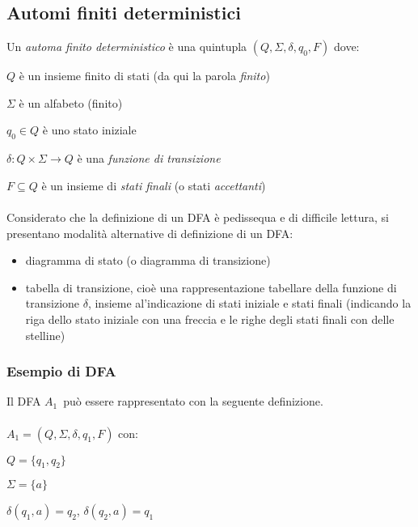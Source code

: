 \documentclass[]{article}
\begin{document}
\subsection{Automi finiti deterministici}
Un \textit{automa finito deterministico} è una quintupla \mbox{$(Q, \Sigma, \delta, q_0, F)$} dove:

\mbox{$Q$} è un insieme finito di stati (da qui la parola \textit{finito})

\mbox{$\Sigma$} è un alfabeto (finito)

\mbox{$q_0 \in Q$} è uno stato iniziale

\mbox{$\delta \colon Q \times \Sigma \to Q$} è una \textit{funzione di transizione}

\mbox{$F \subseteq Q$} è un insieme di \textit{stati finali} (o stati \textit{accettanti})
\\
\\
Considerato che la definizione di un DFA è pedissequa e di difficile lettura, si presentano modalità alternative di definizione di un DFA:
\begin{itemize}
    \item diagramma di stato (o diagramma di transizione)
    \item tabella di transizione, cioè una rappresentazione tabellare della funzione di transizione \mbox{$\delta$}, insieme al'indicazione di stati iniziale e stati finali (indicando la riga dello stato iniziale con una freccia e le righe degli stati finali con delle stelline)
\end{itemize}



\newpage
\subsubsection{Esempio di DFA}

Il DFA \mbox{$A_1$}\ può essere rappresentato con la seguente definizione.
\\
\\
\mbox{$A_1 = (Q, \Sigma, \delta, q_1, F)$} con:

\mbox{$Q = \{ q_1, q_2 \}$}

\mbox{$\Sigma = \{ a \}$}

\mbox{$\delta(q_1, a) = q_2$}, \mbox{$\delta(q_2, a) = q_1$}
\end{document}
